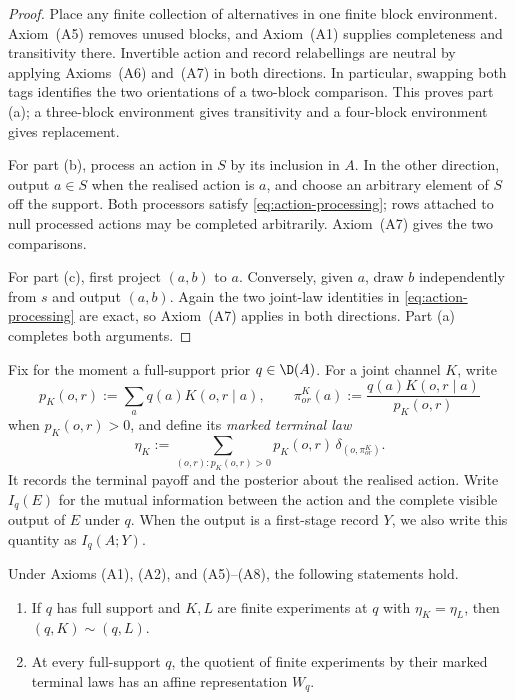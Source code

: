 \begin{proof}
Place any finite collection of alternatives in one finite block environment.
Axiom~\textup{(A5)} removes unused blocks, and Axiom~\textup{(A1)} supplies
completeness and transitivity there.  Invertible action and record relabellings
are neutral by applying Axioms~\textup{(A6)} and~\textup{(A7)} in both
directions.  In particular, swapping both tags identifies the two orientations
of a two-block comparison.  This proves part \textup{(a)}; a three-block
environment gives transitivity and a four-block environment gives replacement.

For part \textup{(b)}, process an action in $S$ by its inclusion in $A$.  In the
other direction, output $a\in S$ when the realised action is $a$, and choose an
arbitrary element of $S$ off the support.  Both processors satisfy
\eqref{eq:action-processing}; rows attached to null processed actions may be
completed arbitrarily.  Axiom~\textup{(A7)} gives the two comparisons.

For part \textup{(c)}, first project $(a,b)$ to $a$.  Conversely, given $a$,
draw $b$ independently from $s$ and output $(a,b)$.  Again the two joint-law
identities in \eqref{eq:action-processing} are exact, so Axiom~\textup{(A7)}
applies in both directions.  Part \textup{(a)} completes both arguments.
\end{proof}

Fix for the moment a full-support prior $q\in\D(A)$.  For a joint channel $K$,
write
\[
p_K(o,r):=\sum_a q(a)K(o,r\mid a),
\qquad
\pi^K_{or}(a):=\frac{q(a)K(o,r\mid a)}{p_K(o,r)}
\]
when $p_K(o,r)>0$, and define its \emph{marked terminal law}
\begin{equation}
\eta_K:=\sum_{(o,r):p_K(o,r)>0}
p_K(o,r)\,\delta_{(o,\pi^K_{or})}.
\label{lf:eq:marked-law}
\end{equation}
It records the terminal payoff and the posterior about the realised action.
Write $I_q(E)$ for the mutual information between the action and the complete
visible output of $E$ under $q$.  When the output is a first-stage record $Y$,
we also write this quantity as $I_q(A;Y)$.

\begin{lemma}\label{lf:lem:terminal-affine}
Under Axioms \textup{(A1)}, \textup{(A2)}, and
\textup{(A5)--(A8)}, the following statements hold.
\begin{enumerate}[label=\textup{(\alph*)},leftmargin=*]
\item If $q$ has full support and $K,L$ are finite experiments at $q$ with
  $\eta_K=\eta_L$, then
  $(q,K)\sim(q,L)$.
\item At every full-support $q$, the quotient of finite experiments by their
  marked terminal laws has an affine representation $W_q$.
\end{enumerate}
\end{lemma}

